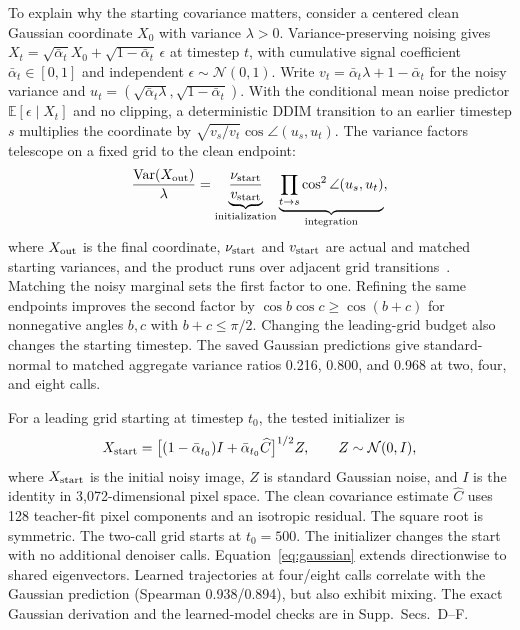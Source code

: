To explain why the starting covariance matters, consider a centered clean
Gaussian coordinate $X_0$ with variance
$\lambda>0$. Variance-preserving noising gives
$X_t=\sqrt{\bar\alpha_t}X_0+\sqrt{1-\bar\alpha_t}\,\epsilon$ at
timestep $t$, with cumulative signal coefficient $\bar\alpha_t\in[0,1]$
and independent $\epsilon\sim\mathcal N(0,1)$. Write
$v_t=\bar\alpha_t\lambda+1-\bar\alpha_t$ for the noisy variance and
$u_t=(\sqrt{\bar\alpha_t\lambda},\sqrt{1-\bar\alpha_t})$.
With the conditional mean noise predictor $\mathbb E[\epsilon\mid X_t]$
and no clipping, a deterministic DDIM
transition to an earlier timestep $s$ multiplies the coordinate by
$\sqrt{v_s/v_t}\cos\angle(u_s,u_t)$. The variance factors telescope on a
fixed grid to the clean endpoint:
\begin{equation}
\frac{\operatorname{Var}(X_{\rm out})}{\lambda}
=\underbrace{\frac{\nu_{\rm start}}{v_{\rm start}}}_{\text{initialization}}
\underbrace{\prod_{t\rightarrow s}\cos^2\angle(u_s,u_t)}_{\text{integration}},
\label{eq:gaussian}
\end{equation}
where $X_{\rm out}$ is the final coordinate, $\nu_{\rm start}$ and
$v_{\rm start}$ are actual and matched starting variances, and the product
runs over adjacent grid transitions~\cite{benita2025spectral,pierret2025gaussian}.
Matching the noisy marginal sets the first factor to one. Refining the same
endpoints improves the second factor by $\cos b\cos c\geq\cos(b+c)$
for nonnegative angles $b,c$ with $b+c\leq\pi/2$. Changing the leading-grid
budget also changes the starting timestep. The saved Gaussian predictions
give standard-normal to matched aggregate variance ratios 0.216, 0.800,
and 0.968 at two, four, and eight calls.

For a leading grid starting at timestep $t_0$, the tested initializer is
\begin{equation}
X_{\rm start}=
\big[(1-\bar\alpha_{t_0})I+\bar\alpha_{t_0}\widehat C\big]^{1/2}Z,
\qquad Z\sim\mathcal N(0,I),
\label{eq:covariance_start}
\end{equation}
where $X_{\rm start}$ is the initial noisy image, $Z$ is standard Gaussian
noise, and $I$ is the identity in 3,072-dimensional pixel space. The clean
covariance estimate $\widehat C$ uses 128 teacher-fit pixel components
and an isotropic residual. The square root is symmetric.
The two-call grid starts at $t_0=500$. The initializer changes the start
with no additional denoiser calls. Equation~\ref{eq:gaussian} extends
directionwise to shared eigenvectors. Learned trajectories at four/eight
calls correlate with the Gaussian prediction (Spearman 0.938/0.894), but
also exhibit mixing. The exact Gaussian derivation and the learned-model
checks are in Supp.~Secs.~D--F.
